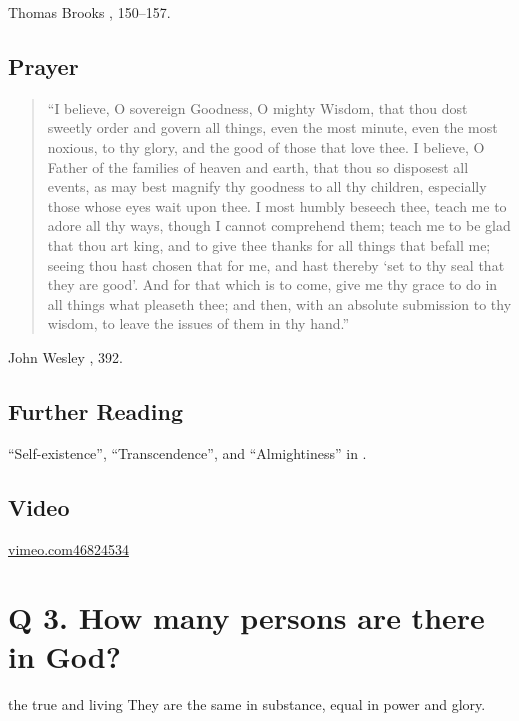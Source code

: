 \documentclass[00-main.tex]{subfiles}
\begin{document}
\begin{flushright}
Thomas Brooks \cite{Brooks:1866a}, 150--157.
\end{flushright}

\subsection{Prayer}
\begin{quote}
``I believe, O sovereign Goodness, O mighty Wisdom, that thou dost sweetly order and govern all things, even the most minute, even the most noxious, to thy glory, and the good of those that love thee. I believe, O Father of the families of heaven and earth, that thou so disposest all events, as may best magnify thy goodness to all thy children, especially those whose eyes wait upon thee. I most humbly beseech thee, teach me to adore all thy ways, though I cannot comprehend them; teach me to be glad that thou art king, and to give thee thanks for all things that befall me; seeing thou hast chosen that for me, and hast thereby `set to thy seal that they are good'. And for that which is to come, give me thy grace to do in all things what pleaseth thee; and then, with an absolute submission to thy wisdom, to leave the issues of them in thy hand.''
\end{quote}

\begin{flushright}
John Wesley \cite{Wesley:1831}, 392.
\end{flushright}



\begin{paracol}{2}
\subsection{Further Reading}

``Self-existence'', ``Transcendence'', and ``Almightiness'' in \cite{Packer:2001}.

\switchcolumn 

\subsection{Video}
\href{https://vimeo.com/46824534}{vimeo.com\Slash{}46824534}
\end{paracol}

\section{Q  3. How many persons are there in God?}
the true and living  They are the same in substance, equal in power and glory.
\end{document}
